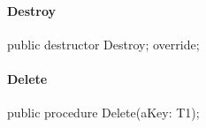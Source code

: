 \documentclass{report}
\begin{document}
\paragraph*{Destroy}\hspace*{\fill}

\begin{list}{}{
\setlength{\itemindent}{0cm}
\setlength{\listparindent}{0cm}
\setlength{\leftmargin}{\evensidemargin}
\addtolength{\leftmargin}{\tmplength}
\settowidth{\labelsep}{X}
\addtolength{\leftmargin}{\labelsep}
\setlength{\labelwidth}{\tmplength}
}
\begin{flushleft}
\item[\textbf{Declaration}\hfill]
\begin{ttfamily}
public destructor Destroy; override;\end{ttfamily}


\end{flushleft}
\end{list}
\paragraph*{Delete}\hspace*{\fill}

\begin{list}{}{
\setlength{\itemindent}{0cm}
\setlength{\listparindent}{0cm}
\setlength{\leftmargin}{\evensidemargin}
\addtolength{\leftmargin}{\tmplength}
\settowidth{\labelsep}{X}
\addtolength{\leftmargin}{\labelsep}
\setlength{\labelwidth}{\tmplength}
}
\begin{flushleft}
\item[\textbf{Declaration}\hfill]
\begin{ttfamily}
public procedure Delete(aKey: T1);\end{ttfamily}


\end{flushleft}
\end{list}
\end{document}
